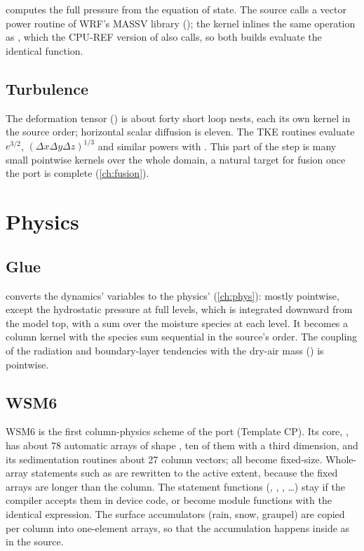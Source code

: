  computes the full pressure from the equation of state. The source calls a vector power routine
of WRF's MASSV library (); the kernel inlines the same operation as , which the CPU-REF
version of  also calls, so both builds evaluate the identical function.

\subsection{Turbulence}

The deformation tensor () is about forty short loop nests, each its own kernel in the source
order; horizontal scalar diffusion is eleven. The TKE routines evaluate $e^{3/2}$, $(\Delta x\Delta y\Delta z)^{1/3}$
and similar powers with . This part of the step is many small pointwise kernels over the whole domain, a
natural target for fusion once the port is complete (\cref{ch:fusion}).

\section{Physics}

\subsection{Glue}

 converts the dynamics' variables to the physics' (\cref{ch:phys}): mostly pointwise, except the
hydrostatic pressure at full levels, which is integrated downward from the model top, with a sum over the moisture
species at each level. It becomes a column kernel with the species sum sequential in the source's order. The coupling
of the radiation and boundary-layer tendencies with the dry-air mass () is pointwise.

\subsection{WSM6}

WSM6 is the first column-physics scheme of the port (Template CP). Its core, , has about 78
automatic arrays of shape , ten of them with a third dimension, and its sedimentation routines
about 27 column vectors; all become fixed-size. Whole-array statements such as  are rewritten to
the active extent, because the fixed arrays are longer than the column. The statement functions (,
, , \dots) stay if the compiler accepts them in device code, or become module functions with
the identical expression. The surface accumulators (rain, snow, graupel) are copied per column into one-element
arrays, so that the accumulation happens inside  as in the source.

